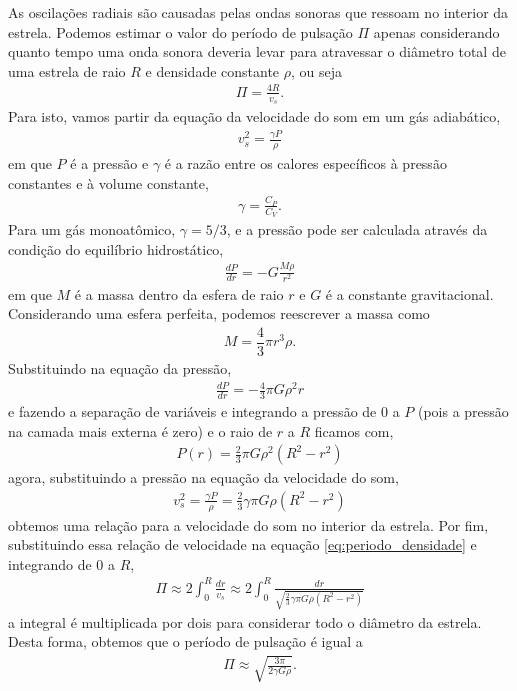 As oscilações radiais são  causadas pelas ondas sonoras que ressoam no interior da estrela. Podemos estimar o valor do período de pulsação $ \Pi$ apenas considerando quanto tempo uma onda sonora deveria levar para atravessar o diâmetro total de uma estrela de raio $R$ e densidade constante $\rho$, ou seja
\begin{align}
\Pi = \frac{4 R}{v_s} . \label{eq:periodo_densidade}
\end{align}
Para isto, vamos partir da equação da velocidade do som em um gás adiabático,
\begin{align}
v_s^2 = \frac{\gamma P}{\rho}
\end{align}
em que $P$ é a pressão e $\gamma$ é a razão entre os calores específicos à pressão constantes e à volume constante,
\begin{align}
\gamma = \frac{C_P}{C_V}.
\end{align}
Para um gás monoatômico, $\gamma = 5/3$, e a pressão pode ser calculada através da condição do equilíbrio hidrostático,  %
\begin{align}
\frac{dP}{dr} = - G\frac{M \rho}{r^2}
\end{align}
em que $M$ é a massa dentro da esfera de raio $r$ e $G$ é a constante gravitacional. Considerando uma esfera perfeita, podemos reescrever a massa como
\begin{align}
M = \dfrac{4}{3}\pi r^3 \rho .
\end{align}
Substituindo na equação da pressão,
\begin{align}
\frac{dP}{dr} = - \frac{4}{3}\pi G \rho^2 r
\end{align}
e fazendo a separação de variáveis e integrando a pressão de $ 0$ a $P$ (pois a pressão na camada mais externa é zero) e o raio de $r$ a $R$ ficamos com,
\begin{align}
P(r) = \frac{2}{3}\pi G \rho^2 (R^2 - r^2)
\end{align}
agora, substituindo a pressão na equação da velocidade do som,
\begin{align}
v_s^2 = \frac{\gamma P}{\rho} = \frac{2}{3}\gamma \pi G \rho (R^2 - r^2)
\end{align}
obtemos uma relação para a velocidade do som no interior da estrela. Por fim, substituindo essa relação de velocidade na equação \eqref{eq:periodo_densidade} e integrando de $0$ a $R$,
\begin{align}
\Pi \approx 2 \int_0^R \frac{dr}{v_s} \approx 2 \int_0^R \frac{dr}{\sqrt{\frac{2}{3}\gamma \pi G \rho (R^2 - r^2)}}
\end{align}
a integral é multiplicada por dois para considerar todo o diâmetro da estrela. Desta forma, obtemos que o período de pulsação é igual a
\begin{align}
\Pi \approx \sqrt{\frac{3\pi}{2\gamma G \rho}} \text{.}
\end{align}

